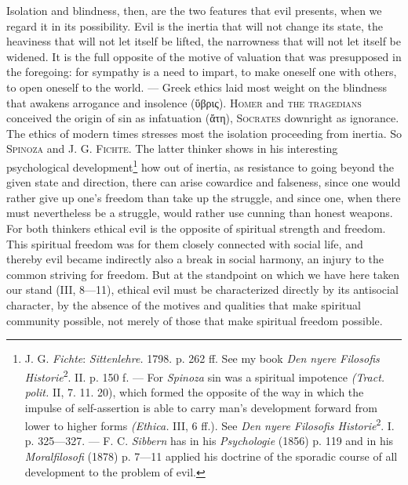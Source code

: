 \documentclass[12pt,a4paper,openany]{book}
\newcommand{\opage}[1]{\marginnote{\footnotesize\textit{[#1]}}}
\begin{document}
Isolation and blindness, then, are the two features that evil presents, when we regard it in its
possibility. Evil is the inertia that will not change its state, the heaviness that will not let itself be
lifted, the narrowness that will not let itself be widened. It is the full opposite of the motive of
valuation that was presupposed in the foregoing: for sympathy is a need to impart, to make oneself one
with others, to open oneself to the world. --- Greek ethics laid most weight on the blindness that awakens
arrogance and insolence (ὕβρις). \textsc{Homer} and \textsc{the tragedians} conceived the origin of sin as
infatuation (ἄτη), \textsc{Socrates} downright as ignorance. The ethics of modern times stresses most the
isolation proceeding from inertia. So \textsc{Spinoza} and J. G. \textsc{Fichte}. The latter thinker shows
in his interesting psychological development\footnote[1]{J. G. \emph{Fichte}: \textit{Sittenlehre.}
1798. p. 262 ff. See my book \textit{Den nyere Filosofis Historie}\textsuperscript{2}. II. p. 150 f. ---
For \emph{Spinoza} sin was a spiritual impotence \textit{(Tract. polit.} II, 7. 11. 20), which formed the
opposite of the way in which the impulse of self-assertion is able to carry man's development forward
from lower to higher forms \textit{(Ethica.} III, 6 ff.). See \textit{Den nyere Filosofis
Historie}\textsuperscript{2}. I. p. 325---327. --- F. C. \emph{Sibbern} has in his \textit{Psychologie}
(1856) p. 119 and in his \textit{Moralfilosofi} (1878) p. 7---11 applied his doctrine of the sporadic
course of all development to the problem of evil.} how out of inertia, as resistance to going beyond the
given state and direction, there can arise cowardice and falseness, since one would rather give up one's
freedom than take up the struggle, and since one, when there must nevertheless
\opage{128}be a struggle, would rather use cunning than honest weapons. For both thinkers ethical evil is the
opposite of spiritual strength and freedom. This spiritual freedom was for them closely connected with
social life, and thereby evil became indirectly also a break in social harmony, an injury to the common
striving for freedom. But at the standpoint on which we have here taken our stand (III, 8---11), ethical
evil must be characterized directly by its antisocial character, by the absence of the motives and
qualities that make spiritual community possible, not merely of those that make spiritual freedom
possible.
\end{document}
